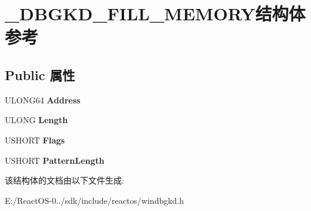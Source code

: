 \hypertarget{struct___d_b_g_k_d___f_i_l_l___m_e_m_o_r_y}{}\section{\+\_\+\+D\+B\+G\+K\+D\+\_\+\+F\+I\+L\+L\+\_\+\+M\+E\+M\+O\+R\+Y结构体 参考}
\label{struct___d_b_g_k_d___f_i_l_l___m_e_m_o_r_y}
\subsection*{Public 属性}
\begin{DoxyCompactItemize}
\item 
\mbox{\label{struct___d_b_g_k_d___f_i_l_l___m_e_m_o_r_y_ad7f84c77420a8e1b37d06131220010a5}} 
U\+L\+O\+N\+G64 {\bfseries Address}
\item 
\mbox{\label{struct___d_b_g_k_d___f_i_l_l___m_e_m_o_r_y_a23a2c1ed1faaa65824c013c70d766db3}} 
U\+L\+O\+NG {\bfseries Length}
\item 
\mbox{\label{struct___d_b_g_k_d___f_i_l_l___m_e_m_o_r_y_afb453e22b343a6e4322f743f54e5e775}} 
U\+S\+H\+O\+RT {\bfseries Flags}
\item 
\mbox{\label{struct___d_b_g_k_d___f_i_l_l___m_e_m_o_r_y_ac9ff029fa2dc5ab12876c6964bfa9985}} 
U\+S\+H\+O\+RT {\bfseries Pattern\+Length}
\end{DoxyCompactItemize}


该结构体的文档由以下文件生成\+:\begin{DoxyCompactItemize}
\item 
E\+:/\+React\+O\+S-\/0../sdk/include/reactos/windbgkd.\+h\end{DoxyCompactItemize}
